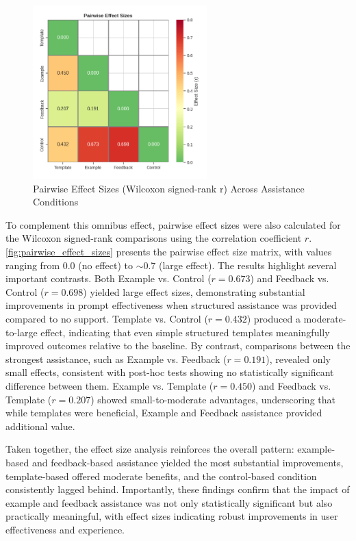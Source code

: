 \begin{figure}[h]
\centering
\includegraphics[width=0.6\textwidth]{figures/06.png}
\caption{Pairwise Effect Sizes (Wilcoxon signed-rank r) Across Assistance Conditions}
\label{fig:pairwise_effect_sizes}
\end{figure}

To complement this omnibus effect, pairwise effect sizes were also calculated for the Wilcoxon signed-rank comparisons using the correlation coefficient $r$. \autoref{fig:pairwise_effect_sizes} presents the pairwise effect size matrix, with values ranging from 0.0 (no effect) to $\sim$0.7 (large effect). The results highlight several important contrasts. Both Example vs. Control ($r = 0.673$) and Feedback vs. Control ($r = 0.698$) yielded large effect sizes, demonstrating substantial improvements in prompt effectiveness when structured assistance was provided compared to no support. Template vs. Control ($r = 0.432$) produced a moderate-to-large effect, indicating that even simple structured templates meaningfully improved outcomes relative to the baseline. By contrast, comparisons between the strongest assistance, such as Example vs. Feedback ($r = 0.191$), revealed only small effects, consistent with post-hoc tests showing no statistically significant difference between them. Example vs. Template ($r = 0.450$) and Feedback vs. Template ($r = 0.207$) showed small-to-moderate advantages, underscoring that while templates were beneficial, Example and Feedback assistance provided additional value.

Taken together, the effect size analysis reinforces the overall pattern: example-based and feedback-based assistance yielded the most substantial improvements, template-based offered moderate benefits, and the control-based condition consistently lagged behind. Importantly, these findings confirm that the impact of example and feedback assistance was not only statistically significant but also practically meaningful, with effect sizes indicating robust improvements in user effectiveness and experience.

